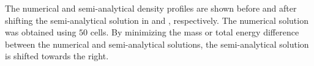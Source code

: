 \documentclass[times,doublespace]{fldauth}%
\begin{document}
The numerical and semi-analytical density profiles are shown before and after shifting the semi-analytical solution in  and , respectively. The numerical solution was obtained using $50$ cells. By minimizing the mass or total energy difference between the numerical and semi-analytical solutions, the semi-analytical solution is shifted towards the right.
%
\begin{figure}[h]
    

\end{figure}
\end{document}
